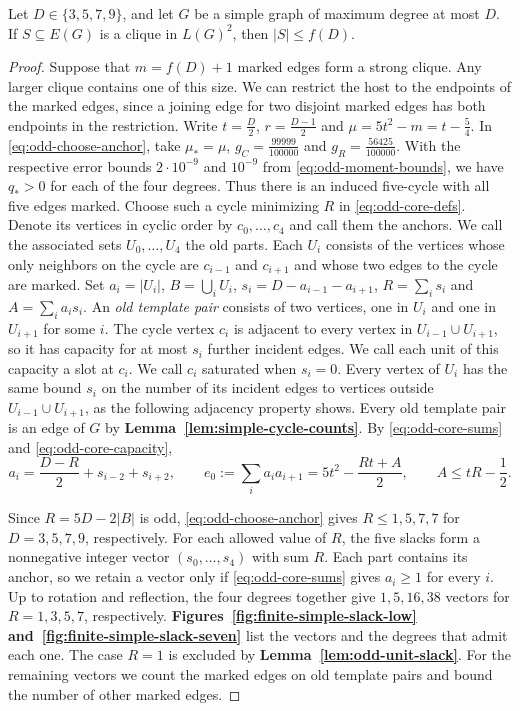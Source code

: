 \begin{lemma}\label{lem:simple-small-support}
Let $D\in\{3,5,7,9\}$, and let $G$ be a simple graph of maximum
degree at most $D$. If $S\subseteq E(G)$ is a clique in $L(G)^2$,
then $|S|\leq f(D)$.
\end{lemma}

\begin{proof}
Suppose that $m=f(D)+1$ marked edges form a strong clique. Any larger clique contains one of this size.
We can restrict the host to the endpoints of the marked edges, since
a joining edge for two disjoint marked edges has both endpoints in
the restriction. Write $t=\frac D2$, $r=\frac{D-1}{2}$ and
$\mu=5t^2-m=t-\frac54$. In \eqref{eq:odd-choose-anchor}, take
$\mu_*=\mu$, $g_C=\frac{99999}{100000}$ and $g_R=\frac{56425}{100000}$.
With the respective error bounds $2\cdot10^{-9}$ and $10^{-9}$ from
\eqref{eq:odd-moment-bounds}, we have $q_*>0$ for each of the four
degrees. Thus there is an induced five-cycle with all five edges marked.
Choose such a cycle minimizing $R$ in \eqref{eq:odd-core-defs}.
Denote its vertices in cyclic
order by $c_0,\ldots,c_4$ and call them the anchors. We call the
associated sets $U_0,\ldots,U_4$ the old parts. Each $U_i$ consists of the vertices whose
only neighbors on the cycle are $c_{i-1}$ and $c_{i+1}$ and whose two
edges to the cycle are marked. Set $a_i=|U_i|$, $B=\bigcup_i U_i$,
$s_i=D-a_{i-1}-a_{i+1}$, $R=\sum_i s_i$ and $A=\sum_i a_is_i$.
An \emph{old template pair} consists of two vertices, one in $U_i$
and one in $U_{i+1}$ for some $i$. The cycle vertex $c_i$ is
adjacent to every vertex in $U_{i-1}\cup U_{i+1}$, so it has
capacity for at most $s_i$ further incident edges. We call each
unit of this capacity a slot at $c_i$. We call $c_i$ saturated
when $s_i=0$. Every vertex of $U_i$ has the same bound $s_i$ on the
number of its incident edges to vertices outside $U_{i-1}\cup U_{i+1}$,
as the following adjacency property shows.
Every old template pair is an edge of $G$ by \textbf{Lemma~\ref{lem:simple-cycle-counts}}. By \eqref{eq:odd-core-sums}
and \eqref{eq:odd-core-capacity},
\[
 a_i=\frac{D-R}{2}+s_{i-2}+s_{i+2},\qquad
 e_0:=\sum_i a_i a_{i+1}=5t^2-\frac{Rt+A}{2},\qquad
 A\leq tR-\frac{1}{2}.
\]

Since $R=5D-2|B|$ is odd, \eqref{eq:odd-choose-anchor} gives
$R\leq1,5,7,7$ for $D=3,5,7,9$, respectively.
For each allowed value of $R$, the five slacks form a nonnegative
integer vector $(s_0,\ldots,s_4)$ with sum $R$. Each part contains
its anchor, so we retain a vector only if \eqref{eq:odd-core-sums}
gives $a_i\geq1$ for every $i$. Up to rotation and reflection,
the four degrees together give $1,5,16,38$ vectors for
$R=1,3,5,7$, respectively.
\textbf{Figures~\ref{fig:finite-simple-slack-low}
and~\ref{fig:finite-simple-slack-seven}} list the vectors and the degrees
that admit each one. The case $R=1$ is excluded by
\textbf{Lemma~\ref{lem:odd-unit-slack}}. For the remaining vectors we
count the marked edges on old template pairs and bound the number
of other marked edges.


\end{proof}
